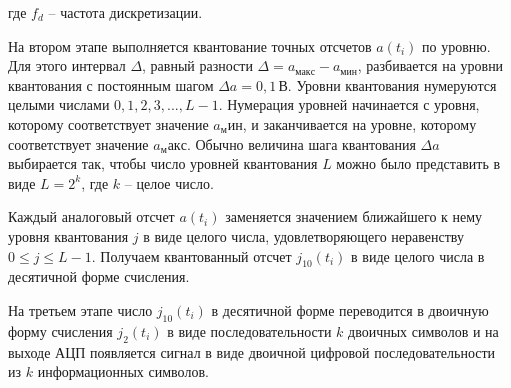 \documentclass[a4paper, 12pt]{article}
\begin{document}
где $f_d$ -- частота дискретизации.

На втором этапе выполняется квантование точных отсчетов 
$a(t_i)$ по уровню. Для этого интервал $\Delta$, равный 
разности $\Delta=a_{макс} - a_{мин}$, разбивается на уровни 
квантования с постоянным шагом $\Delta a =0,1\, В$. 
Уровни квантования нумеруются целыми числами 
$0,1,2,3,...,L-1$. Нумерация уровней начинается с уровня, 
которому соответствует значение $a_мин$, и заканчивается на 
уровне, которому соответствует значение $a_макс$. Обычно
величина шага квантования $\Delta a$ выбирается так, чтобы 
число уровней квантования $L$ можно было представить в виде 
$L=2^k$, где $k$ -- целое число. 

Каждый аналоговый отсчет $a(t_i)$ заменяется значением 
ближайшего к нему уровня квантования $j$ в виде целого числа, 
удовлетворяющего неравенству $0\leq j \leq L-1$. 
Получаем квантованный отсчет $j_{10}(t_i)$ в виде целого 
числа в десятичной форме счисления.

На третьем этапе число $j_{10}(t_i)$ в десятичной форме 
переводится в двоичную форму счисления $j_2(t_i)$ в виде 
последовательности $k$ двоичных
символов и на выходе АЦП появляется сигнал в виде двоичной цифровой последовательности из $k$ информационных символов.
\end{document}
